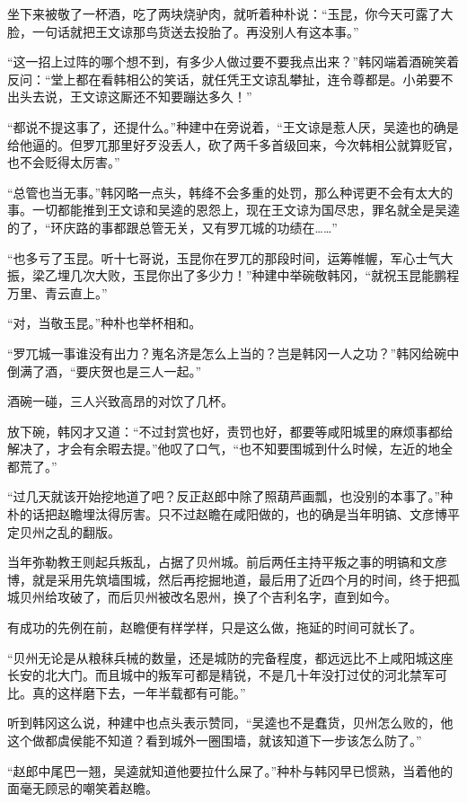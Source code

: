 坐下来被敬了一杯酒，吃了两块烧驴肉，就听着种朴说：“玉昆，你今天可露了大脸，一句话就把王文谅那鸟货送去投胎了。再没别人有这本事。”

“这一招上过阵的哪个想不到，有多少人做过要不要我点出来？”韩冈端着酒碗笑着反问：“堂上都在看韩相公的笑话，就任凭王文谅乱攀扯，连令尊都是。小弟要不出头去说，王文谅这厮还不知要蹦达多久！”

“都说不提这事了，还提什么。”种建中在旁说着，“王文谅是惹人厌，吴逵也的确是给他逼的。但罗兀那里好歹没丢人，砍了两千多首级回来，今次韩相公就算贬官，也不会贬得太厉害。”

“总管也当无事。”韩冈略一点头，韩绛不会多重的处罚，那么种谔更不会有太大的事。一切都能推到王文谅和吴逵的恩怨上，现在王文谅为国尽忠，罪名就全是吴逵的了，“环庆路的事都跟总管无关，又有罗兀城的功绩在……”

“也多亏了玉昆。听十七哥说，玉昆你在罗兀的那段时间，运筹帷幄，军心士气大振，梁乙埋几次大败，玉昆你出了多少力！”种建中举碗敬韩冈，“就祝玉昆能鹏程万里、青云直上。”

“对，当敬玉昆。”种朴也举杯相和。

“罗兀城一事谁没有出力？嵬名济是怎么上当的？岂是韩冈一人之功？”韩冈给碗中倒满了酒，“要庆贺也是三人一起。”

酒碗一碰，三人兴致高昂的对饮了几杯。

放下碗，韩冈才又道：“不过封赏也好，责罚也好，都要等咸阳城里的麻烦事都给解决了，才会有余暇去提。”他叹了口气，“也不知要围城到什么时候，左近的地全都荒了。”

“过几天就该开始挖地道了吧？反正赵郎中除了照葫芦画瓢，也没别的本事了。”种朴的话把赵瞻埋汰得厉害。只不过赵瞻在咸阳做的，也的确是当年明镐、文彦博平定贝州之乱的翻版。

当年弥勒教王则起兵叛乱，占据了贝州城。前后两任主持平叛之事的明镐和文彦博，就是采用先筑墙围城，然后再挖掘地道，最后用了近四个月的时间，终于把孤城贝州给攻破了，而后贝州被改名恩州，换了个吉利名字，直到如今。

有成功的先例在前，赵瞻便有样学样，只是这么做，拖延的时间可就长了。

“贝州无论是从粮秣兵械的数量，还是城防的完备程度，都远远比不上咸阳城这座长安的北大门。而且城中的叛军可都是精锐，不是几十年没打过仗的河北禁军可比。真的这样磨下去，一年半载都有可能。”

听到韩冈这么说，种建中也点头表示赞同，“吴逵也不是蠢货，贝州怎么败的，他这个做都虞侯能不知道？看到城外一圈围墙，就该知道下一步该怎么防了。”

“赵郎中尾巴一翘，吴逵就知道他要拉什么屎了。”种朴与韩冈早已惯熟，当着他的面毫无顾忌的嘲笑着赵瞻。

